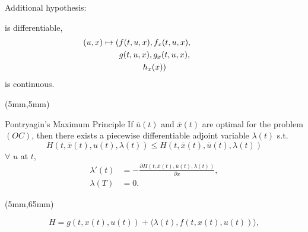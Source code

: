 \begin{frame}[plain]
\begin{textblock*}{60mm}
\begin{graybox}{Additional hypothesis:}
\begin{enumerate}[(\textbf{{C}}-4)]
                is differentiable,
                \\
                \begin{multline*}
                    \hspace*{-15mm}
                    (u,x) 
                    \mapsto 
                    (f(t,u,x),f_x(t,u,x),
                    \\
                    g(t,u,x),g_x(t,u,x),
                    \\
                    h_x(x))
                \end{multline*}
                is continuous.
            \end{enumerate}
        \end{graybox}
    \end{textblock*}
\end{frame}
\begin{frame}[plain]
    \begin{textblock*}{120mm}(5mm,5mm)
        \begin{graybox}{Pontryagin’s Maximum Principle}
            If $\bar{u}(t)$ and $\bar{x}(t)$ are optimal for the problem 
            $(OC)$, then there exists a piecewise differentiable adjoint 
            variable $\lambda(t)$ s.t.
            \begin{equation*}
                H(t,\bar{x}(t),u(t),\lambda(t))\leq 
                H(t,\bar{x}(t),\bar{u}(t),\lambda(t))
            \end{equation*}
            $\forall$ $u$ at $t$,
%
            \begin{align*}
                    \lambda'(t) &= -\frac{\partial 
                    H(t,\bar{x}(t),\bar{u}(t),\lambda(t))}{\partial x},\\
                \lambda(T) &= 0.
            \end{align*}
        \end{graybox}
    \end{textblock*}
    \begin{textblock*}{75mm}(5mm,65mm)
        \begin{yellowbox}{}
            \begin{equation*}
                H=g(t,x(t),u(t))+\langle \lambda(t),f(t,x(t),u(t))\rangle,
            \end{equation*}
        \end{yellowbox}
    \end{textblock*}
\end{frame}
